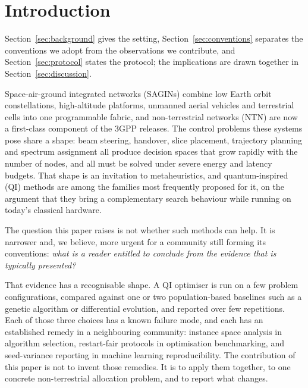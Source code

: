 \documentclass[runningheads]{llncs}
\begin{document}
\section{Introduction}

Section~\ref{sec:background} gives the setting, Section~\ref{sec:conventions} separates the
conventions we adopt from the observations we contribute, and Section~\ref{sec:protocol} states
the protocol; the implications are drawn together in Section~\ref{sec:discussion}.

Space-air-ground integrated networks (SAGINs) combine low Earth orbit constellations,
high-altitude platforms, unmanned aerial vehicles and terrestrial cells into one programmable
fabric, and non-terrestrial networks (NTN) are now a first-class component of the 3GPP releases.
The control problems these systems pose share a shape: beam steering, handover, slice placement,
trajectory planning and spectrum assignment all produce decision spaces that grow rapidly with
the number of nodes, and all must be solved under severe energy and latency budgets. That shape
is an invitation to metaheuristics, and quantum-inspired (QI) methods are among the families most
frequently proposed for it, on the argument that they bring a complementary search behaviour
while running on today's classical hardware.

The question this paper raises is not whether such methods can help. It is narrower and, we
believe, more urgent for a community still forming its conventions: \emph{what is a reader
entitled to conclude from the evidence that is typically presented?}

That evidence has a recognisable shape. A QI optimiser is run on a few problem configurations,
compared against one or two population-based baselines such as a genetic algorithm or
differential evolution, and reported over few repetitions. Each of those three choices has a
known failure mode, and each has an established remedy in a neighbouring community: instance
space analysis in algorithm selection, restart-fair protocols in optimisation benchmarking, and
seed-variance reporting in machine learning reproducibility. The contribution of this paper is
not to invent those remedies. It is to apply them together, to one concrete non-terrestrial
allocation problem, and to report what changes.
\end{document}
